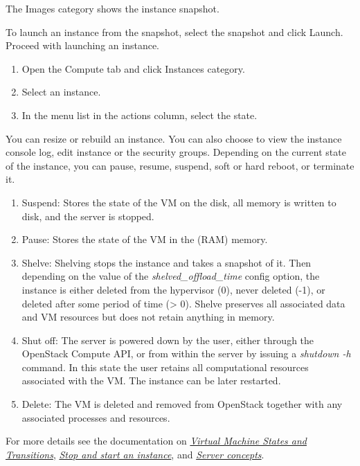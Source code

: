 The Images category shows the instance snapshot.

To launch an instance from the snapshot, select the snapshot and click
Launch. Proceed with launching an instance.

\label{manage-an-instance}

\begin{enumerate}
\def\labelenumi{\arabic{enumi}.}
\item Open the Compute tab and click Instances category.
\item Select an instance.
\item In the menu list in the actions column, select the state.
\end{enumerate}

You can resize or rebuild an instance. You can also choose to view the
instance console log, edit instance or the security groups. Depending on
the current state of the instance, you can pause, resume, suspend, soft
or hard reboot, or terminate it.

\label{server-power-down-states}

\begin{enumerate}
\item Suspend: Stores the state of the VM on the disk, all memory is written to disk, and the server is stopped.
\item Pause: Stores the state of the VM in the (RAM) memory.
\item Shelve: Shelving stops the instance and takes a snapshot of it. Then depending on the value of the \emph{shelved\_offload\_time} config option, the instance is either deleted from the hypervisor (0), never deleted (-1), or deleted after some period of time (> 0). Shelve preserves all associated data and VM resources but does not retain anything in memory.
\item Shut off: The server is powered down by the user, either through the OpenStack Compute API, or from within the server by issuing a \emph{shutdown -h} command. In this state the user retains all computational resources associated with the VM. The instance can be later restarted.
\item Delete: The VM is deleted and removed from \gls{OpenStack} together with any associated processes and resources.
\end{enumerate}

For more details see the documentation on \href{https://docs.openstack.org/nova/pike/reference/vm-states.html}{\emph{Virtual Machine States and Transitions}}, \href{https://docs.openstack.org/mitaka/user-guide/cli_stop_and_start_an_instance.html}{\emph{Stop and start an instance}},
and \href{https://developer.openstack.org/api-guide/compute/server_concepts.html}{\emph{Server concepts}}.

